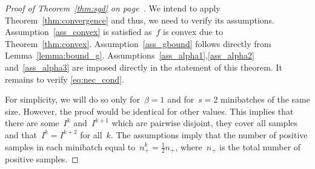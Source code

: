 \sgd*
\begin{proof}[Proof of Theorem~\ref{thm:sgd} on page~\pageref{thm:sgd}]
  We intend to apply Theorem~\ref{thm:convergence} and thus, we need to verify its assumptions. Assumption~\ref{ass_convex} is satisfied as~$f$ is convex due to Theorem~\ref{thm:convex}. Assumption~\ref{ass_gbound} follows directly from Lemma~\ref{lemma:bound_g}. Assumptions~\ref{ass_alpha1},\ref{ass_alpha2} and~\ref{ass_alpha3} are imposed directly in the statement of this theorem. It remains to verify \eqref{eq:nec_cond}.

  For simplicity, we will do so only for~$\beta=1$ and for~$s=2$ minibatches of the same size. However, the proof would be identical for other values. This implies that there are some~$I^k$ and~$I^{k+1}$ which are pairwise disjoint, they cover all samples and that~$I^k=I^{k+2}$ for all~$k$. The assumptions imply that the number of positive samples in each minibatch equal to~$n_+^k=\frac{1}{2}n_+$, where~$n_+$ is the total number of positive samples.


\end{proof}

